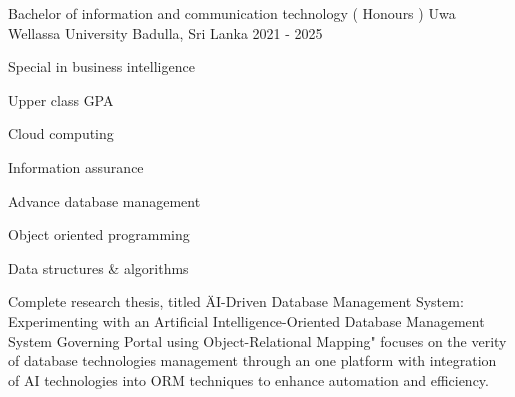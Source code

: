 

\begin{cventries}

  \cventry
    {Bachelor of information and communication technology ( Honours )} %
    {Uwa Wellassa University} %
    {Badulla, Sri Lanka} %
    {2021 - 2025} %
    {
      \begin{cvitems} %
        \item {Special in business intelligence }
        \item {Upper class GPA}
        \item {Cloud computing}
        \item {Information assurance }
        \item {Advance database management}
        \item {Object oriented programming}
        \item {Data structures  &  algorithms}
        \item {Complete research thesis, titled \"AI-Driven Database Management System: Experimenting with an Artificial Intelligence-Oriented Database Management System Governing Portal using Object-Relational Mapping" focuses on the verity of database technologies management through an one platform with integration of AI technologies into ORM techniques to enhance automation and efficiency.}
      \end{cvitems}
    }

\end{cventries}
